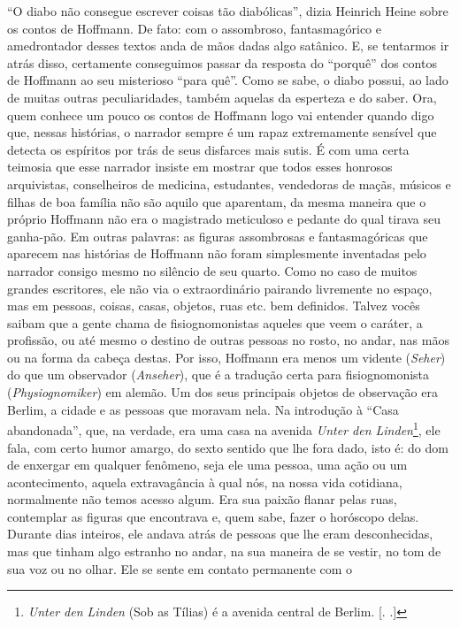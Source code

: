 ``O diabo não consegue escrever coisas tão diabólicas'', dizia Heinrich
Heine sobre os contos de Hoffmann. De fato: com o assombroso,
fantasmagórico e amedrontador desses textos anda de mãos dadas algo
satânico. E, se tentarmos ir atrás disso, certamente conseguimos passar
da resposta do ``porquê'' dos contos de Hoffmann ao seu misterioso
``para quê''. Como se sabe, o diabo possui, ao lado de muitas outras
peculiaridades, também aquelas da esperteza e do saber. Ora, quem
conhece um pouco os contos de Hoffmann logo vai entender quando digo
que, nessas histórias, o narrador sempre é um rapaz extremamente
sensível que detecta os espíritos por trás de seus disfarces mais sutis.
É com uma certa teimosia que esse narrador insiste em mostrar que todos
esses honrosos arquivistas, conselheiros de medicina, estudantes,
vendedoras de maçãs, músicos e filhas de boa família não são aquilo que
aparentam, da mesma maneira que o próprio Hoffmann não era o magistrado
meticuloso e pedante do qual tirava seu ganha-pão. Em outras palavras:
as figuras assombrosas e fantasmagóricas que aparecem nas histórias de
Hoffmann não foram simplesmente inventadas pelo narrador consigo mesmo
no silêncio de seu quarto. Como no caso de muitos grandes escritores,
ele não via o extraordinário pairando livremente no espaço, mas em
pessoas, coisas, casas, objetos, ruas etc. bem definidos. Talvez vocês
saibam que a gente chama de fisiognomonistas aqueles que veem o caráter,
a profissão, ou até mesmo o destino de outras pessoas no rosto, no
andar, nas mãos ou na forma da cabeça destas. Por isso, Hoffmann era
menos um vidente (\emph{Seher}) do que um observador (\emph{Anseher}),
que é a tradução certa para fisiognomonista (\emph{Physiognomiker}) em
alemão. Um dos seus principais objetos de observação era Berlim, a
cidade e as pessoas que moravam nela. Na introdução à ``Casa
abandonada'', que, na verdade, era uma casa na avenida \emph{Unter den
Linden}\footnote{\emph{Unter den Linden} (Sob as Tílias) é a avenida
  central de Berlim. [. .]}, ele fala, com certo humor amargo,
do sexto sentido que lhe fora dado, isto é: do dom de enxergar em
qualquer fenômeno, seja ele uma pessoa, uma ação ou um acontecimento,
aquela extravagância à qual nós, na nossa vida cotidiana, normalmente
não temos acesso algum. Era sua paixão flanar pelas ruas, contemplar as
figuras que encontrava e, quem sabe, fazer o horóscopo delas. Durante
dias inteiros, ele andava atrás de pessoas que lhe eram desconhecidas,
mas que tinham algo estranho no andar, na sua maneira de se vestir, no
tom de sua voz ou no olhar. Ele se sente em contato permanente com o

